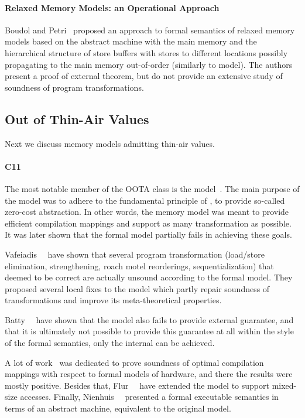 \paragraph{Relaxed Memory Models: an Operational Approach}

Boudol and Petri~\cite{Boudol-Petri:POPL09} proposed 
an approach to formal semantics of relaxed memory models 
based on the abstract machine with the main memory 
and the hierarchical structure of store buffers 
with stores to different locations possibly 
propagating to the main memory out-of-order
(similarly to \PSO model).
The authors present a proof of external \DRF theorem,
but do not provide an extensive study 
of soundness of program transformations.

\subsection{Out of Thin-Air Values}

Next we discuss memory models admitting thin-air values. 

\paragraph{C11}

The most notable member of the OOTA class is the \CMM model~\cite{Batty-al:POPL11}.
The main purpose of the \CMM model was to adhere to the fundamental principle of \CPP, 
\ie to provide so-called zero-cost abstraction. 
In other words, the memory model was meant to provide 
efficient compilation mappings and support as many transformation as possible.
It was later shown that the formal model partially fails in achieving these goals.

Vafeiadis~\etal~\cite{Vafeiadis-al:POPL15} have shown that several program transformation 
(load/store elimination, strengthening, roach motel reorderings, sequentialization) 
that deemed to be correct are actually unsound according to the formal model.
They proposed several local fixes to the model which 
partly repair soundness of transformations and improve 
its meta-theoretical properties. 

Batty~\etal~\cite{Batty-al:ESOP15} have shown that 
the model also fails to provide external \DRF guarantee, 
and that it is ultimately not possible to provide this guarantee
at all within the style of the \CMM formal semantics,
only the internal \DRF can be achieved. 

A lot of work~\cite{Batty-al:POPL11, Sarkar-al:PLDI12, Batty-al:POPL12, Batty-al:POPL16} 
was dedicated to prove soundness of optimal compilation mappings 
with respect to formal models of hardware, 
and there the results were mostly positive.
Besides that, Flur~\etal~\cite{Flur-al:POPL17} have extended the model to support mixed-size accesses.
Finally, Nienhuis~\etal~\cite{Nienhuis-al:OOPSLA16} presented 
a formal executable semantics in terms of an abstract machine, 
equivalent to the original \CMM model. 

